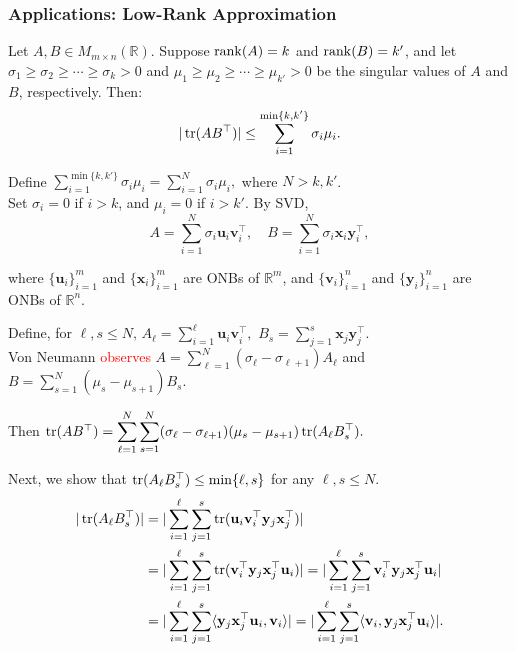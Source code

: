 \subsubsection*{Applications: Low-Rank Approximation}

\begin{theorem}
Let $A,B\in M_{m\times n}(\mathbb{R})$. Suppose $\operatorname{rank}(A)=k$ and $\operatorname{rank}(B)=k'$,
and let $\sigma_1\ge\sigma_2\ge\cdots\ge\sigma_k>0$ and $\mu_1\ge\mu_2\ge\cdots\ge\mu_{k'}>0$ be the singular values of $A$ and $B$, respectively. Then:
\[|\operatorname{tr}(AB^\top)|\le\sum_{i=1}^{\min\{k,k'\}}\sigma_i\mu_i.\]
\end{theorem}

\begin{pfbox}
Define $\displaystyle\sum_{i=1}^{\min\{k,k'\}}\sigma_i\mu_i = \sum_{i=1}^{N}\sigma_i\mu_i,$ where $N>k,k'$.\\
Set $\sigma_i=0$ if $i>k$, and $\mu_i=0$ if $i>k'$.
By SVD,
\[
    A = \sum_{i=1}^{N}\sigma_i\mathbf{u}_i\mathbf{v}_i^\top,\quad
    B = \sum_{i=1}^{N}\sigma_i\mathbf{x}_i\mathbf{y}_i^\top,
\]

where $\{\mathbf{u}_i\}^m_{i=1}$ and $\{\mathbf{x}_i\}^m_{i=1}$ are ONBs of $\mathbb{R}^m$, and $\{\mathbf{v}_i\}^n_{i=1}$ and $\{\mathbf{y}_i\}^n_{i=1}$ are ONBs of $\mathbb{R}^n$.

Define, for $\ell,s\le N,\, A_\ell = \displaystyle\sum_{i=1}^{\ell}\mathbf{u}_i\mathbf{v}_i^\top,\,\, B_s = \displaystyle\sum_{j=1}^{s}\mathbf{x}_j\mathbf{y}_j^\top$.\\
Von Neumann \textcolor{red}{observes} $A=\displaystyle\sum_{\ell=1}^{N}(\sigma_\ell-\sigma_{\ell+1})A_\ell$ and $B = \displaystyle\sum_{s=1}^{N}(\mu_s-\mu_{s+1})B_s$. 

Then $\operatorname{tr}(AB^\top)=\displaystyle\sum_{\ell=1}^{N}\displaystyle\sum_{s=1}^{N}(\sigma_\ell-\sigma_{\ell+1})(\mu_s-\mu_{s+1})\operatorname{tr}(A_\ell B_s^\top).$

Next, we show that $\operatorname{tr}(A_\ell B_s^\top)\le\min\{\ell,s\}$ for any $\ell,s\le N.$
\begin{align*}
    |\operatorname{tr}(A_\ell B_s^\top)| &= |\sum_{i=1}^{\ell}\sum_{j=1}^{s}\operatorname{tr}(\mathbf{u}_i\mathbf{v}_i^\top\mathbf{y}_j\mathbf{x}_j^\top)|\\
    &= |\sum_{i=1}^{\ell}\sum_{j=1}^{s}\operatorname{tr}(\mathbf{v}_i^\top\mathbf{y}_j\mathbf{x}_j^\top \mathbf{u}_i)| = |\sum_{i=1}^{\ell}\sum_{j=1}^{s}\mathbf{v}_i^\top\mathbf{y}_j\mathbf{x}_j^\top \mathbf{u}_i|\\
    &= |\sum_{i=1}^{\ell}\sum_{j=1}^{s} \langle\mathbf{y}_j\mathbf{x}_j^\top \mathbf{u}_i, \mathbf{v}_i\rangle| =  |\sum_{i=1}^{\ell}\sum_{j=1}^{s} \langle \mathbf{v}_i, \mathbf{y}_j\mathbf{x}_j^\top \mathbf{u}_i\rangle|.
\end{align*}


\end{pfbox}
